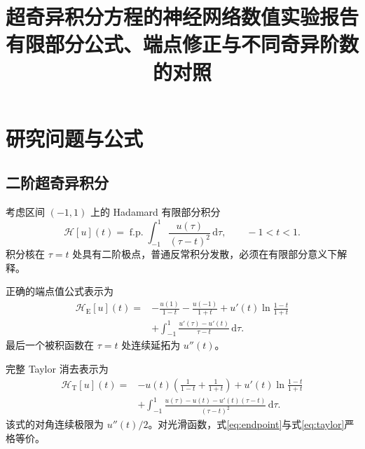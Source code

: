\documentclass[UTF8,fontset=none,11pt,a4paper]{ctexart}
\title{\bfseries 超奇异积分方程的神经网络数值实验报告\\[0.4em]
\large 有限部分公式、端点修正与不同奇异阶数的对照}
\author{}
\date{}
\newcommand{\HE}{\mathcal H_{\mathrm E}}
\newcommand{\HT}{\mathcal H_{\mathrm T}}
\begin{document}
\maketitle


\section{研究问题与公式}

\subsection{二阶超奇异积分}

考虑区间 $(-1,1)$ 上的 Hadamard 有限部分积分
\begin{equation}
\mathcal H[u](t)=\operatorname{f.p.}\!\int_{-1}^{1}
\frac{u(\tau)}{(\tau-t)^2}\,\mathrm d\tau,
\qquad -1<t<1.
\end{equation}
积分核在 $\tau=t$ 处具有二阶极点，普通反常积分发散，必须在有限部分意义下解释。

正确的端点值公式表示为
\begin{align}
\HE[u](t)={}&
-\frac{u(1)}{1-t}-\frac{u(-1)}{1+t}
+u'(t)\ln\frac{1-t}{1+t}\nonumber\\
&+\int_{-1}^{1}
\frac{u'(\tau)-u'(t)}{\tau-t}\,\mathrm d\tau .
\label{eq:endpoint}
\end{align}
最后一个被积函数在 $\tau=t$ 处连续延拓为 $u''(t)$。

完整 Taylor 消去表示为
\begin{align}
\HT[u](t)={}&
-u(t)\left(\frac{1}{1-t}+\frac{1}{1+t}\right)
+u'(t)\ln\frac{1-t}{1+t}\nonumber\\
&+\int_{-1}^{1}
\frac{u(\tau)-u(t)-u'(t)(\tau-t)}{(\tau-t)^2}
\,\mathrm d\tau .
\label{eq:taylor}
\end{align}
该式的对角连续极限为 $u''(t)/2$。对光滑函数，式\eqref{eq:endpoint}与式\eqref{eq:taylor}严格等价。
\end{document}
